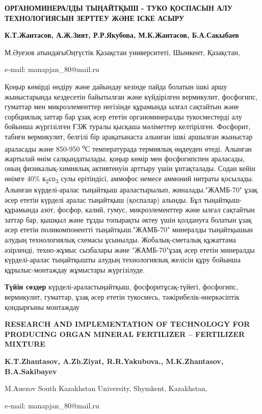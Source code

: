 \begin{center}
{\large\bfseries ОРГАНОМИНЕРАЛДЫ ТЫҢАЙТҚЫШ - ТУКО ҚОСПАСЫН АЛУ ТЕХНОЛОГИЯСЫН ЗЕРТТЕУ ЖӘНЕ ІСКЕ АСЫРУ}

{\bfseries К.Т.Жантасов, А.Ж.Зият, Р.Р.Якубова, М.К.Жантасов\envelope, Б.А.Сакыбаев}

М.Әуезов атындағыОңтүстік Қазақстан университеті, Шымкент, Қазақстан,

e-mail: manapjan\_80@mail.ru
\end{center}

Қоңыр көмірді өндіру және дайындау кезінде пайда болатын ішкі аршу
жыныстарында кездесетін байытылған және күйдірілген вермикулит,
фосфогипс, гуматтар мен микроэлементтер негізінде құрамында ылғал
сақтайтын және сорбциялық заттар бар ұзақ әсер ететін органоминералды
тукосместерді алу бойынша жүргізілген ҒЗЖ туралы қысқаша мәліметтер
келтірілген. Фосфорит, табиғи вермикулит, белгілі бір арақатынаста
алынған ішкі аршылған жыныстар араласады және 850-950
\textsuperscript{о}С температурада термиялық өңдеуден өтеді. Алынған
жартылай өнім салқындатылады, қоңыр көмір мен фосфогипспен араласады,
оның физикалық-химиялық активтенуін арттыру үшін ұнтақталады. Содан
кейін өнімге 40\% к\textsubscript{2}со\textsubscript{3} сулы ерітіндісі,
аммофос немесе аммоний нитраты қосылады. Алынған күрделі-аралас
тыңайтқыш араластырылып, жиналады."ЖАМБ-70" ұзақ әсер ететін күрделі
аралас тыңайтқыш (қоспалар) алынды. Бұл тыңайтқыш-құрамында азот,
фосфор, калий, гумус, микроэлементтер және ылғал сақтайтын заттар бар,
қышқыл және тұзды топырақты әктеу үшін қолдануға болатын ұзақ әсер
ететін поликомпонентті тыңайтқыш."ЖАМБ-70" минералды тыңайтқышын алудың
технологиялық схемасы ұсынылды. Жобалық-сметалық құжаттама әзірленді,
техно-жұмыс сызбалары және "ЖАМБ-70"ұзақ әсер ететін минералды
күрделі-аралас тыңайтқышты алудың технологиялық желісін құру бойынша
құрылыс-монтаждау жұмыстары жүргізілуде.

{\bfseries Түйін сөздер} күрделі-араластыңайтқыш, фосфоритұсақ-түйегі,
фосфогипс, вермикулит, гуматтар, ұзақ әсер ететін тукосмесь,
тәжірибелік-өнеркәсіптік қондырғыны монтаждау

\begin{center}
{\large\bfseries RESEARCH AND IMPLEMENTATION OF TECHNOLOGY FOR PRODUCING ORGAN MINERAL FERTILIZER -- FERTILIZER MIXTURE}

{\bfseries K.T.Zhantasov, A.Zh.Ziyat, R.R.Yakubova., M.K.Zhantasov\envelope, B.A.Sakibayev}

M.Auezov South Kazakhstan University, Shymkent, Kazakhstan,

e-mail: manapjan\_80@mail.ru
\end{center}


